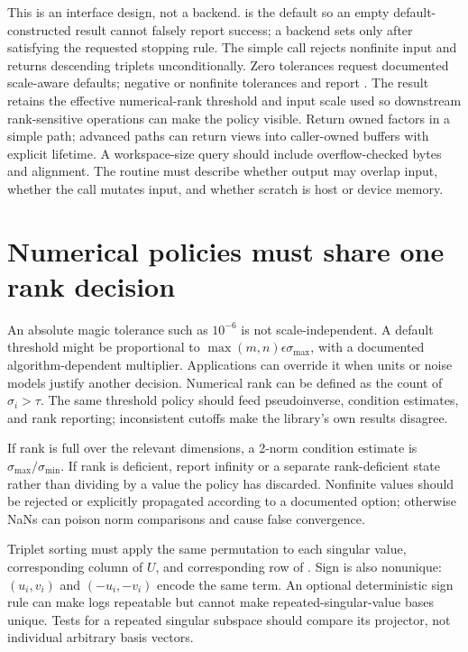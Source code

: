 This is an interface design, not a backend.  is the default so an empty default-constructed result cannot falsely report success; a backend sets  only after satisfying the requested stopping rule. The simple call rejects nonfinite input and returns descending triplets unconditionally. Zero tolerances request documented scale-aware defaults; negative or nonfinite tolerances and  report . The result retains the effective numerical-rank threshold and input scale used so downstream rank-sensitive operations can make the policy visible. Return owned factors in a simple path; advanced paths can return views into caller-owned buffers with explicit lifetime. A workspace-size query should include overflow-checked bytes and alignment. The routine must describe whether output may overlap input, whether the call mutates input, and whether scratch is host or device memory.

\section{Numerical policies must share one rank decision}\label{02-foundations-ii-ch038-numerical-policies-must-share-one-rank-decision}

\hypertarget{02-foundations-ii-ch038-numerical-policies-must-share-one-rank-decision}{}

An absolute magic tolerance such as \(10^{-6}\) is not scale-independent. A default threshold might be proportional to \(\max(m,n)\epsilon\sigma_{\max}\), with a documented algorithm-dependent multiplier. Applications can override it when units or noise models justify another decision. Numerical rank can be defined as the count of \(\sigma_i>\tau\). The same threshold policy should feed pseudoinverse, condition estimates, and rank reporting; inconsistent cutoffs make the library's own results disagree.

If rank is full over the relevant dimensions, a 2-norm condition estimate is \(\sigma_{\max}/\sigma_{\min}\). If rank is deficient, report infinity or a separate rank-deficient state rather than dividing by a value the policy has discarded. Nonfinite values should be rejected or explicitly propagated according to a documented option; otherwise NaNs can poison norm comparisons and cause false convergence.

Triplet sorting must apply the same permutation to each singular value, corresponding column of \(U\), and corresponding row of . Sign is also nonunique: \((u_i,v_i)\) and \((-u_i,-v_i)\) encode the same term. An optional deterministic sign rule can make logs repeatable but cannot make repeated-singular-value bases unique. Tests for a repeated singular subspace should compare its projector, not individual arbitrary basis vectors.

